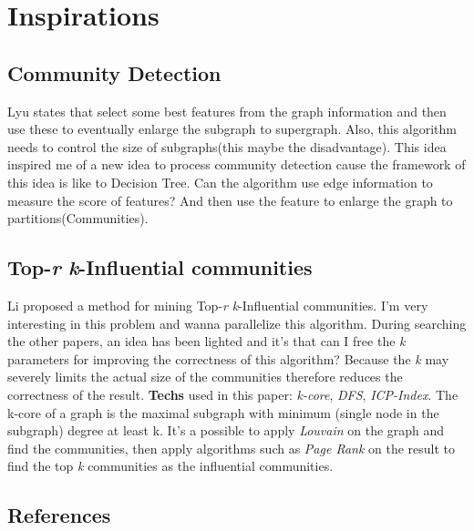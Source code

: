 \documentclass{article}
\begin{document}
	\section{Inspirations}
	\subsection{Community Detection}
	Lyu\cite{lyu2016scalable} states that select some best features from the graph information and then use these to eventually enlarge the subgraph to supergraph. 
	\newline
	Also, this algorithm needs to control the size of subgraphs(this maybe the disadvantage).
	\newline
	This idea inspired me of a new idea to process community detection cause the framework of this idea is like to Decision Tree. Can the algorithm use edge information to measure the score of features? And then use the feature to enlarge the graph to partitions(Communities).
	\subsection{Top-\emph{r} \emph{k}-Influential communities}
	Li\cite{li2015influential} proposed a method for mining Top-\emph{r} \emph{k}-Influential communities. I'm very interesting in this problem and wanna parallelize this algorithm. During searching the other papers, an idea has been lighted and it's that can I free the \emph{k} parameters for improving the correctness of this algorithm? Because the \emph{k} may severely limits the actual size of the communities therefore reduces the correctness of the result.
	\newline
	\textbf{Techs} used in this paper: \emph{k-core}, \emph{DFS}, \emph{ICP-Index}.
	\newline
	The k-core of a graph is the maximal subgraph with minimum (single node in the subgraph) degree at least k.
	\newline
	It's a possible to apply \emph{Louvain} on the graph and find the communities, then apply algorithms such as \emph{Page Rank} on the result to find the top \emph{k} communities as the influential communities.

	\begin{appendix}
		\section{References}
		
		
	\end{appendix}
\end{document}
